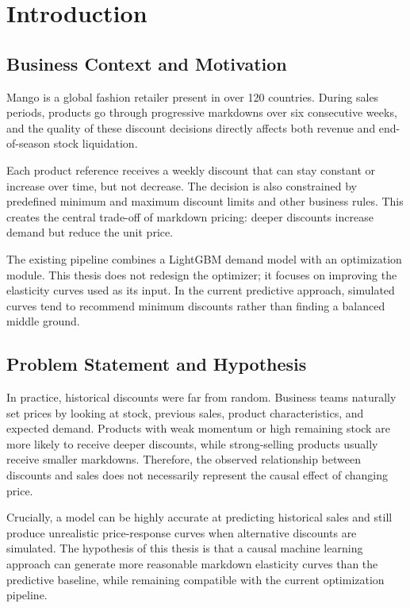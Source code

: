 \chapter{Introduction}

\label{Chapter1}

\section{Business Context and Motivation}

Mango is a global fashion retailer present in over 120 countries. During sales periods, products go through progressive markdowns over six consecutive weeks, and the quality of these discount decisions directly affects both revenue and end-of-season stock liquidation.

Each product reference receives a weekly discount that can stay constant or increase over time, but not decrease. The decision is also constrained by predefined minimum and maximum discount limits and other business rules. This creates the central trade-off of markdown pricing: deeper discounts increase demand but reduce the unit price.

The existing pipeline combines a LightGBM demand model \cite{ke2017lightgbm} with an optimization module. This thesis does not redesign the optimizer; it focuses on improving the elasticity curves used as its input. In the current predictive approach, simulated curves tend to recommend minimum discounts rather than finding a balanced middle ground.

\section{Problem Statement and Hypothesis}

In practice, historical discounts were far from random. Business teams naturally set prices by looking at stock, previous sales, product characteristics, and expected demand. Products with weak momentum or high remaining stock are more likely to receive deeper discounts, while strong-selling products usually receive smaller markdowns. Therefore, the observed relationship between discounts and sales does not necessarily represent the causal effect of changing price.

Crucially, a model can be highly accurate at predicting historical sales and still produce unrealistic price-response curves when alternative discounts are simulated. The hypothesis of this thesis is that a causal machine learning approach can generate more reasonable markdown elasticity curves than the predictive baseline, while remaining compatible with the current optimization pipeline.

